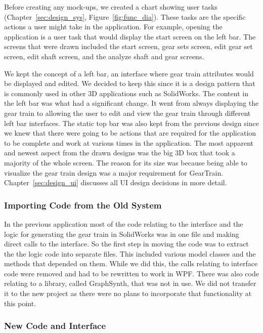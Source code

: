 \begin{doublespace}
Before creating any mock-ups, we created a chart showing user tasks (Chapter~\ref{sec:design_sys}, Figure~\ref{fig:func_dia}). These tasks are the specific actions a user might take in the application. For example, opening the application is a user task that would display the start screen on the left bar. The screens that were drawn included the start screen, gear sets screen, edit gear set screen, edit shaft screen, and the analyze shaft and gear screens.

We kept the concept of a left bar, an interface where gear train attributes would be displayed and edited. We decided to keep this since it is a design pattern that is commonly used in other 3D applications such as SolidWorks. The content in the left bar was what had a significant change. It went from always displaying the gear train to allowing the user to edit and view the gear train through different left bar interfaces. The static top bar was also kept from the previous design since we knew that there were going to be actions that are required for the application to be complete and work at various times in the application. The most apparent and newest aspect from the drawn designs was the big 3D box that took a majority of the whole screen. The reason for its size was because being able to visualize the gear train design was a major requirement for GearTrain. Chapter~\ref{sec:design_ui} discusses all UI design decisions in more detail.

\subsubsection{Importing Code from the Old System}

In the previous application most of the code relating to the interface and the logic for generating the gear train in SolidWorks was in one file and making direct calls to the interface. So the first step in moving the code was to extract the the logic code into separate files. This included various model classes and the methods that depended on them. While we did this, the calls relating to interface code were removed and had to be rewritten to work in WPF. There was also code relating to a library, called GraphSynth, that was not in use. We did not transfer it to the new project as there were no plans to incorporate that functionality at this point.

\subsubsection{New Code and Interface}


\end{doublespace}
